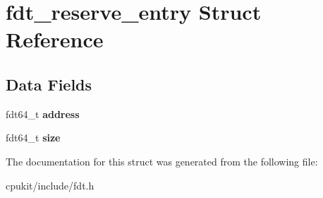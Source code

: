 \hypertarget{structfdt__reserve__entry}{}\section{fdt\+\_\+reserve\+\_\+entry Struct Reference}
\label{structfdt__reserve__entry}
\subsection*{Data Fields}
\begin{DoxyCompactItemize}
\item 
\mbox{\label{structfdt__reserve__entry_a1453319ff97e2d7c2ec0762cee56e98e}} 
fdt64\+\_\+t {\bfseries address}
\item 
\mbox{\label{structfdt__reserve__entry_ace12399f157bc46877fbcddec98da67e}} 
fdt64\+\_\+t {\bfseries size}
\end{DoxyCompactItemize}


The documentation for this struct was generated from the following file\+:\begin{DoxyCompactItemize}
\item 
cpukit/include/fdt.\+h\end{DoxyCompactItemize}
